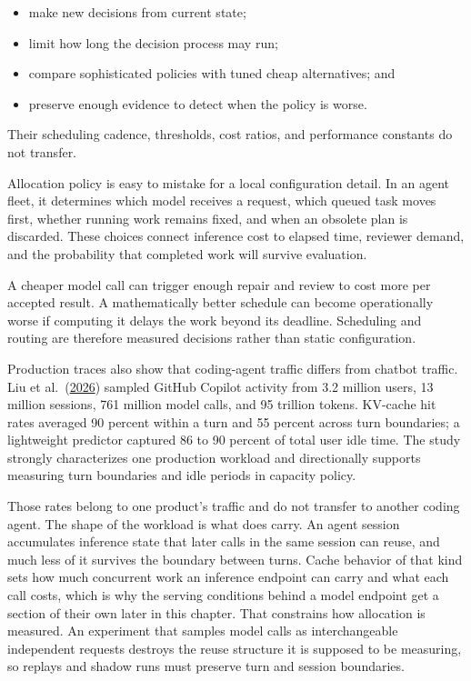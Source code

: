 \begin{itemize}
\tightlist
\item
  make new decisions from current state;
\item
  limit how long the decision process may run;
\item
  compare sophisticated policies with tuned cheap alternatives; and
\item
  preserve enough evidence to detect when the policy is worse.
\end{itemize}

Their scheduling cadence, thresholds, cost ratios, and performance constants do not transfer.

Allocation policy is easy to mistake for a local configuration detail. In an agent fleet, it determines which model receives a request, which queued task moves first, whether running work remains fixed, and when an obsolete plan is discarded. These choices connect inference cost to elapsed time, reviewer demand, and the probability that completed work will survive evaluation.

A cheaper model call can trigger enough repair and review to cost more per accepted result. A mathematically better schedule can become operationally worse if computing it delays the work beyond its deadline. Scheduling and routing are therefore measured decisions rather than static configuration.

Production traces also show that coding-agent traffic differs from chatbot traffic. Liu et al.~(\href{https://arxiv.org/abs/2608.00101}{2026}) sampled GitHub Copilot activity from 3.2 million users, 13 million sessions, 761 million model calls, and 95 trillion tokens. KV-cache hit rates averaged 90 percent within a turn and 55 percent across turn boundaries; a lightweight predictor captured 86 to 90 percent of total user idle time. The study strongly characterizes one production workload and directionally supports measuring turn boundaries and idle periods in capacity policy.

Those rates belong to one product's traffic and do not transfer to another coding agent. The shape of the workload is what does carry. An agent session accumulates inference state that later calls in the same session can reuse, and much less of it survives the boundary between turns. Cache behavior of that kind sets how much concurrent work an inference endpoint can carry and what each call costs, which is why the serving conditions behind a model endpoint get a section of their own later in this chapter. That constrains how allocation is measured. An experiment that samples model calls as interchangeable independent requests destroys the reuse structure it is supposed to be measuring, so replays and shadow runs must preserve turn and session boundaries.

